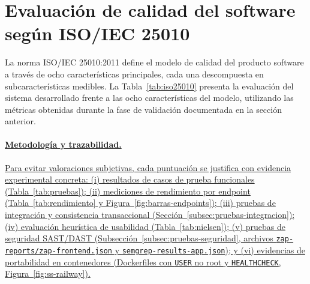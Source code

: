 \documentclass[12pt,a4paper,oneside]{report}
\providecommand{\ul}[1]{\uline{#1}}
\begin{document}
\section{Evaluación de calidad del software según ISO/IEC 25010}\label{sec:iso25010}

La norma ISO/IEC 25010:2011 define el modelo de calidad del producto software a través de ocho características principales, cada una descompuesta en subcaracterísticas medibles. La Tabla~\ref{tab:iso25010} presenta la evaluación del sistema desarrollado frente a las ocho características del modelo, utilizando las métricas obtenidas durante la fase de validación documentada en la sección anterior.

\paragraph{\ul{Metodología y trazabilidad.}} \ul{Para evitar valoraciones subjetivas, cada puntuación se justifica con evidencia experimental concreta: (i) resultados de casos de prueba funcionales (Tabla~\ref{tab:pruebas}); (ii) mediciones de rendimiento por endpoint (Tabla~\ref{tab:rendimiento} y Figura~\ref{fig:barras-endpoints}); (iii) pruebas de integración y consistencia transaccional (Sección~\ref{subsec:pruebas-integracion}); (iv) evaluación heurística de usabilidad (Tabla~\ref{tab:nielsen}); (v) pruebas de seguridad SAST/DAST (Subsección~\ref{subsec:pruebas-seguridad}, archivos \texttt{zap-reports/zap-frontend.json} y \texttt{semgrep-results-app.json}); y (vi) evidencias de portabilidad en contenedores (Dockerfiles con \texttt{USER} no root y \texttt{HEALTHCHECK}, Figura~\ref{fig:ss-railway}).}
\end{document}
